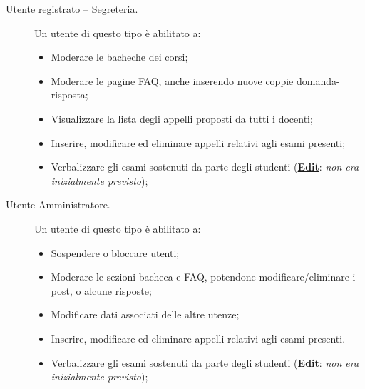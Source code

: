 \documentclass [a4paper,11pt]{book}
\begin{document}
\begin{description}
\item[Utente registrato – Segreteria.] Un utente di questo tipo è abilitato a:

\begin{itemize}
\item Moderare le bacheche dei corsi;
\item Moderare le pagine FAQ, anche inserendo nuove coppie domanda-risposta;
\item Visualizzare la lista degli appelli proposti da tutti i docenti;
\item Inserire, modificare ed eliminare appelli relativi agli esami presenti;
\item Verbalizzare gli esami sostenuti da parte degli studenti (\textbf{\underline{Edit}}: \emph{non era inizialmente previsto});
\end{itemize}

\item[Utente Amministratore.] Un utente di questo tipo è abilitato a:

\begin{itemize}
\item Sospendere o bloccare utenti;
\item Moderare le sezioni bacheca e FAQ, potendone modificare/eliminare i post, o alcune risposte;
\item Modificare dati associati delle altre utenze;
\item Inserire, modificare ed eliminare appelli relativi agli esami presenti.
\item Verbalizzare gli esami sostenuti da parte degli studenti (\textbf{\underline{Edit}}: \emph{non era inizialmente previsto});
\end{itemize}
\end{description}

\medskip
\medskip
\end{document}
